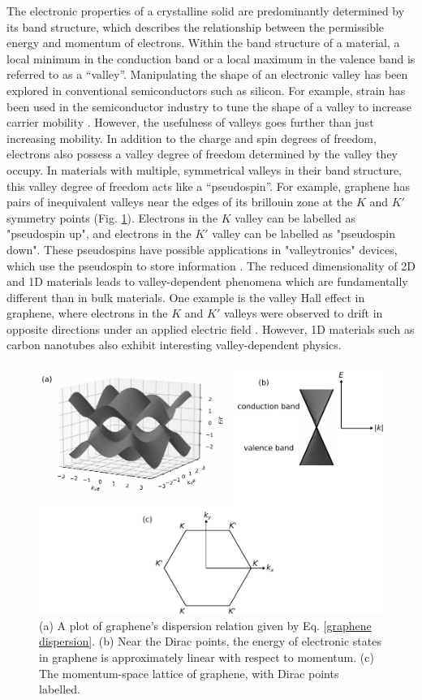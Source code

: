 \documentclass[double,12pt,1in]{beavtex}
\begin{document}
The electronic properties of a crystalline solid are predominantly determined by its band structure, which describes the relationship between the permissible energy and momentum of electrons. Within the band structure of a material, a local minimum in the conduction band or a local maximum in the valence band is referred to as a “valley”. Manipulating the shape of an electronic valley has been explored in conventional semiconductors such as silicon. For example, strain has been used in the semiconductor industry to tune the shape of a valley to increase carrier mobility \cite{thompson_90-nm_2004}. However, the usefulness of valleys goes further than just increasing mobility. In addition to the charge and spin degrees of freedom, electrons also possess a valley degree of freedom determined by the valley they occupy. In materials with multiple, symmetrical valleys in their band structure, this valley degree of freedom acts like a “pseudospin”. For example, graphene has pairs of inequivalent valleys near the edges of its brillouin zone at the $K$ and $K'$ symmetry points (Fig. \ref{graphene dispersion plot intro}). Electrons in the $K$ valley can be labelled as "pseudospin up", and electrons in the $K'$ valley can be labelled as "pseudospin down". These pseudospins have possible applications in "valleytronics" devices, which use the pseudospin to store information \cite{schaibley_valleytronics_2016}. The reduced dimensionality of 2D and 1D materials leads to valley-dependent phenomena which are fundamentally different than in bulk materials. One example is the valley Hall effect in graphene, where electrons in the $K$ and $K'$ valleys were observed to drift in opposite directions under an applied electric field \cite{gorbachev_detecting_2014}. However, 1D materials such as carbon nanotubes also exhibit interesting valley-dependent physics.

\begin{figure}
    \includegraphics[width = 1\textwidth]{Graphene band structure 3D.pdf}
    \caption{(a) A plot of graphene's dispersion relation given by Eq. \ref{graphene dispersion}. (b) Near the Dirac points, the energy of electronic states in graphene is approximately linear with respect to momentum. (c) The momentum-space lattice of graphene, with Dirac points labelled.}
    \label{graphene dispersion plot intro}
\end{figure}
\end{document}
